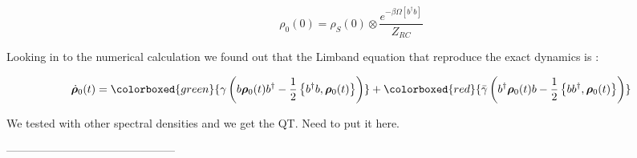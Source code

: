 \documentclass[%
preprint,
onecolumn,
notitlepag,
 amsmath,amssymb,
 aps,
 pra,
]{revtex4-2}
\begin{document}
 
 \begin{equation}\rho_{0}(0)=\rho_{S}(0) \otimes \frac{e^{-\beta \Omega\left[b^{\dagger} b\right]}}{Z_{R C}}\end{equation}



Looking in to the numerical calculation we found out that the Limband equation that reproduce the exact dynamics is :

\begin{equation}
    \dot{\boldsymbol{\rho}}_0(t) =  \colorboxed{green}{ \gamma\left(b \boldsymbol{\rho}_{\mathrm{0}}(t) b^{\dagger}-\frac{1}{2}\left\{b^{\dagger} b, \boldsymbol{\rho}_{\mathrm{0}}(t)\right\}\right) } +  \colorboxed{red}{ \bar{\gamma}\left(b^{\dagger}\boldsymbol{\rho}_{\mathrm{0}}(t) b-\frac{1}{2}\left\{b b^{\dagger}, \boldsymbol{\rho}_{\mathrm{0}}(t) \right\}\right)}
\end{equation}



We tested with other spectral densities and we get the QT. Need to put it here. 


---------------------------------------------
%


%
\end{document}
